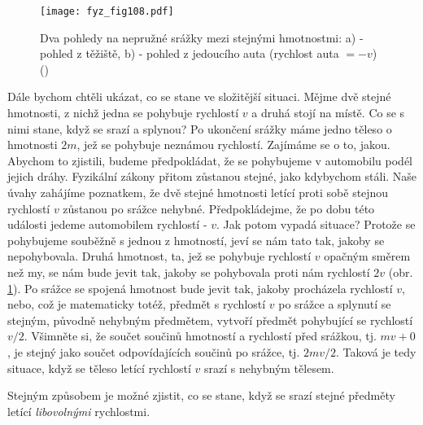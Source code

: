 {{    \begin{figure}[ht!]  %
      \centering
      \texttt{[image: fyz\_fig108.pdf]}
      \caption{Dva pohledy na nepružné srážky mezi stejnými hmotnostmi: a) - pohled z těžiště, b) 
               -  pohled z jedoucího auta (rychlost auta \(= -v\))
              (\cite[s.~145]{Feynman01})}
      \label{fyz:fig108}
    \end{figure}
    Dále bychom chtěli ukázat, co se stane ve složitější situaci. Mějme dvě stejné hmotnosti, z 
    nichž jedna se pohybuje rychlostí \(v\) a druhá stojí na místě. Co se s nimi stane, když se 
    srazí a splynou? Po ukončení srážky máme jedno těleso o hmotnosti \(2m\), jež se pohybuje 
    neznámou rychlostí. Zajímáme se o to, jakou. Abychom to zjistili, budeme předpokládat, že se 
    pohybujeme v automobilu podél jejich dráhy. Fyzikální zákony přitom zůstanou stejné, jako 
    kdybychom stáli. Naše úvahy zahájíme poznatkem, že dvě stejné hmotnosti letící proti sobě 
    stejnou rychlostí \(v\) zůstanou po srážce nehybné. Předpokládejme, že po dobu této události 
    jedeme automobilem rychlostí - \(v\). Jak potom vypadá situace? Protože se pohybujeme souběžně 
    s jednou z hmotností, jeví se nám tato tak, jakoby se nepohybovala. Druhá hmotnost, ta, jež se 
    pohybuje rychlostí \(v\) opačným směrem než my, se nám bude jevit tak, jakoby se pohybovala 
    proti nám rychlostí \(2v\) (obr. \ref{fyz:fig108}). Po srážce se spojená hmotnost bude jevit 
    tak, jakoby procházela rychlostí \(v\), nebo, což je matematicky totéž, předmět s rychlostí 
    \(v\) po srážce a splynutí se stejným, původně nehybným předmětem, vytvoří předmět pohybující 
    se rychlostí \(v/2\). Všimněte si, že součet součinů hmotností a rychlostí před srážkou, tj. 
    \(mv + 0\), je stejný jako součet odpovídajících součinů po srážce, tj. \(2mv/2\). Taková je 
    tedy situace, když se těleso letící rychlostí \(v\) srazí s nehybným tělesem.

    Stejným způsobem je možné zjistit, co se stane, když se srazí stejné předměty letící 
    \emph{libovolnými} rychlostmi.

}}
